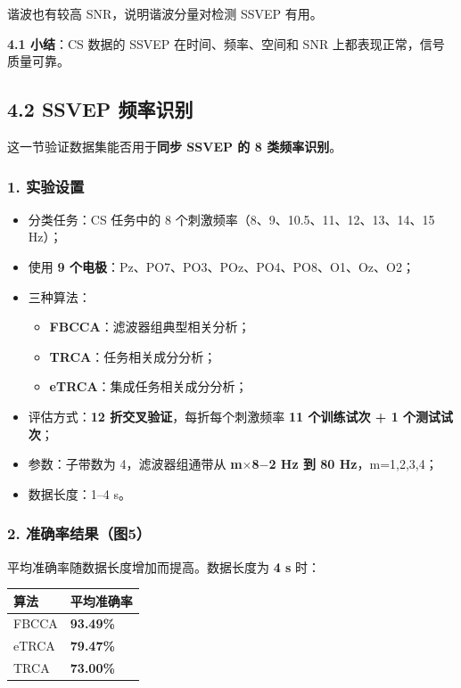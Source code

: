 \documentclass[12pt, a4paper]{ctexart}
\begin{document}
谐波也有较高 SNR，说明谐波分量对检测 SSVEP 有用。

\textbf{4.1 小结}：CS 数据的 SSVEP 在时间、频率、空间和 SNR 上都表现正常，信号质量可靠。

\subsection{4.2 SSVEP 频率识别}

这一节验证数据集能否用于\textbf{同步 SSVEP 的 8 类频率识别}。

\subsubsection*{1. 实验设置}

\begin{itemize}
  \item 分类任务：CS 任务中的 8 个刺激频率（8、9、10.5、11、12、13、14、15 Hz）；
  \item 使用 \textbf{9 个电极}：Pz、PO7、PO3、POz、PO4、PO8、O1、Oz、O2；
  \item 三种算法：
  \begin{itemize}
    \item \textbf{FBCCA}：滤波器组典型相关分析；
    \item \textbf{TRCA}：任务相关成分分析；
    \item \textbf{eTRCA}：集成任务相关成分分析；
  \end{itemize}
  \item 评估方式：\textbf{12 折交叉验证}，每折每个刺激频率 \textbf{11 个训练试次 + 1 个测试试次}；
  \item 参数：子带数为 4，滤波器组通带从 \textbf{m$\times$8$-$2 Hz 到 80 Hz}，m=1,2,3,4；
  \item 数据长度：1--4 s。
\end{itemize}

\subsubsection*{2. 准确率结果（图5）}

平均准确率随数据长度增加而提高。数据长度为 \textbf{4 s} 时：

\begin{table}[h]
\centering\small
\begin{tabular}{ll}
\toprule
\textbf{算法} & \textbf{平均准确率} \\
\midrule
FBCCA & \textbf{93.49\%} \\
eTRCA & \textbf{79.47\%} \\
TRCA & \textbf{73.00\%} \\
\bottomrule
\end{tabular}
\end{table}
\end{document}
